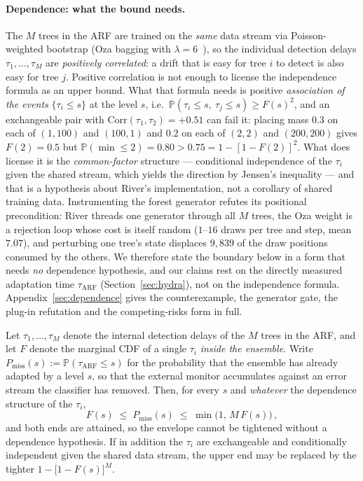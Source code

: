 \documentclass[smallextended]{svjour3}
\begin{document}
\paragraph{Dependence: what the bound needs.}
The $M$ trees in the ARF are trained on the \emph{same} data stream via Poisson-weighted bootstrap (Oza bagging with $\lambda = 6$~\cite{gomes_arf_2017}), so the individual detection delays $\tau_1, \ldots, \tau_M$ are \emph{positively correlated}: a drift that is easy for tree $i$ to detect is also easy for tree $j$.
Positive correlation is not enough to license the independence formula as an upper bound. What that formula needs is positive \emph{association of the events} $\{\tau_i \le s\}$ at the level $s$, i.e.\ $\mathbb{P}(\tau_i \le s,\ \tau_j \le s) \ge F(s)^2$, and an exchangeable pair with $\mathrm{Corr}(\tau_1,\tau_2) = +0.51$ can fail it: placing mass $0.3$ on each of $(1,100)$ and $(100,1)$ and $0.2$ on each of $(2,2)$ and $(200,200)$ gives $F(2) = 0.5$ but $\mathbb{P}(\min \le 2) = 0.80 > 0.75 = 1 - [1-F(2)]^2$.
What does license it is the \emph{common-factor} structure --- conditional independence of the $\tau_i$ given the shared stream, which yields the direction by Jensen's inequality --- and that is a hypothesis about River's implementation, not a corollary of shared training data. Instrumenting the forest generator refutes its positional precondition: River threads one generator through all $M$ trees, the Oza weight is a rejection loop whose cost is itself random ($1$--$16$ draws per tree and step, mean $7.07$), and perturbing one tree's state displaces $9{,}839$ of the draw positions consumed by the others.
We therefore state the boundary below in a form that needs \emph{no} dependence hypothesis, and our claims rest on the directly measured adaptation time $\tau_{\mathrm{ARF}}$ (Section~\ref{sec:hydra}), not on the independence formula. Appendix~\ref{sec:dependence} gives the counterexample, the generator gate, the plug-in refutation and the competing-risks form in full.

\begin{proposition}\label{prop:starvation_boundary}
  Let $\tau_1, \ldots, \tau_M$ denote the internal detection delays of the $M$ trees in the ARF, and let $F$ denote the marginal CDF of a single $\tau_i$ \emph{inside the ensemble}.
  Write $P_{\mathrm{miss}}(s) := \mathbb{P}(\tau_{\mathrm{ARF}} \le s)$ for the probability that the ensemble has already adapted by a level $s$, so that the external monitor accumulates against an error stream the classifier has removed.
  Then, for every $s$ and \emph{whatever} the dependence structure of the $\tau_i$,
  \begin{equation}\label{eq:pmiss}
    F(s) \;\le\; P_{\mathrm{miss}}(s) \;\le\; \min\bigl(1,\, M\,F(s)\bigr)\,,
  \end{equation}
  and both ends are attained, so the envelope cannot be tightened without a dependence hypothesis.
  If in addition the $\tau_i$ are exchangeable and conditionally independent given the shared data stream, the upper end may be replaced by the tighter $1 - \bigl[1 - F(s)\bigr]^M$.
\end{proposition}
\end{document}
